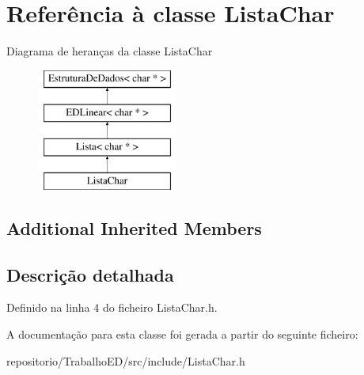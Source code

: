 \hypertarget{classListaChar}{\section{Referência à classe Lista\-Char}
\label{classListaChar}
}
Diagrama de heranças da classe Lista\-Char\begin{figure}[H]
\begin{center}
\leavevmode
\includegraphics[height=4.000000cm]{classListaChar}
\end{center}
\end{figure}
\subsection*{Additional Inherited Members}


\subsection{Descrição detalhada}


Definido na linha 4 do ficheiro Lista\-Char.\-h.



A documentação para esta classe foi gerada a partir do seguinte ficheiro\-:\begin{DoxyCompactItemize}
\item 
repositorio/\-Trabalho\-E\-D/src/include/Lista\-Char.\-h\end{DoxyCompactItemize}
